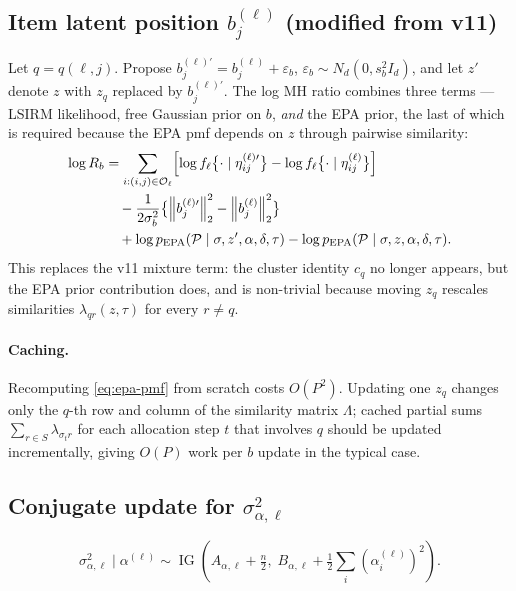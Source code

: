\documentclass[11pt]{article}
\newcommand{\norm}[1]{\left\lVert #1 \right\rVert}
\DeclareMathOperator{\IG}{IG}
\DeclareMathOperator{\EPA}{EPA}
\begin{document}
\subsection{Item latent position $b_j^{(\ell)}$ (modified from v11)}
\label{sec:b-update}

Let $q=q(\ell,j)$.  Propose $b_j^{(\ell)\prime}=b_j^{(\ell)}+\varepsilon_b$,
$\varepsilon_b\sim N_d(0,s_b^2 I_d)$, and let $z'$ denote $z$ with $z_q$
replaced by $b_j^{(\ell)\prime}$.  The log MH ratio combines three terms ---
LSIRM likelihood, free Gaussian prior on $b$, \emph{and} the EPA prior, the
last of which is required because the EPA pmf depends on $z$ through pairwise
similarity:
\begin{align}
    \log R_b
    &=
    \sum_{i:(i,j)\in\mathcal{O}_\ell}
    \!\left[
    \log f_\ell\bigl\{\cdot\mid\eta_{ij}^{(\ell)\prime}\bigr\}-
    \log f_\ell\bigl\{\cdot\mid\eta_{ij}^{(\ell)}\bigr\}
    \right]
    \notag\\
    &\quad
    -\frac{1}{2\sigma_b^2}\bigl\{\norm{b_j^{(\ell)\prime}}_2^2-\norm{b_j^{(\ell)}}_2^2\bigr\}
    \notag\\
    &\quad
    +\log p_{\EPA}(\mathcal{P}\mid\sigma,z',\alpha,\delta,\tau)
    -\log p_{\EPA}(\mathcal{P}\mid\sigma,z,\alpha,\delta,\tau).
    \label{eq:b-mh-ratio}
\end{align}
This replaces the v11 mixture term: the cluster identity $c_q$ no longer
appears, but the EPA prior contribution does, and is non-trivial because
moving $z_q$ rescales similarities $\lambda_{qr}(z,\tau)$ for every $r\ne q$.

\paragraph{Caching.}
Recomputing \eqref{eq:epa-pmf} from scratch costs $O(P^2)$.  Updating one
$z_q$ changes only the $q$-th row and column of the similarity matrix
$\Lambda$; cached partial sums $\sum_{r\in S}\lambda_{\sigma_t r}$ for each
allocation step $t$ that involves $q$ should be updated incrementally,
giving $O(P)$ work per $b$ update in the typical case.

\subsection{Conjugate update for $\sigma_{\alpha,\ell}^2$}

\begin{equation}
    \sigma_{\alpha,\ell}^2\mid\alpha^{(\ell)}\sim
    \IG\!\left(A_{\alpha,\ell}+\tfrac{n}{2},\;
    B_{\alpha,\ell}+\tfrac{1}{2}\textstyle\sum_i(\alpha_i^{(\ell)})^2\right).
    \label{eq:sigma-alpha-update}
\end{equation}
\end{document}
